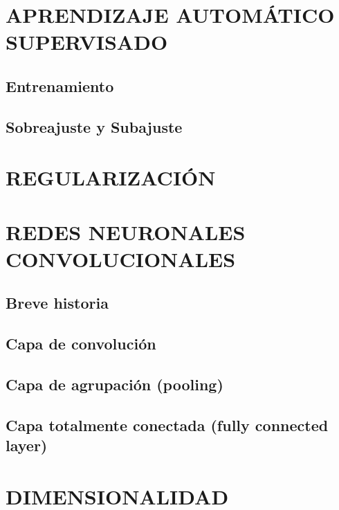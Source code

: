 \section{APRENDIZAJE AUTOMÁTICO SUPERVISADO}

\subsection{Entrenamiento}

\subsection{Sobreajuste y Subajuste}

\section{REGULARIZACIÓN}

\section{REDES NEURONALES CONVOLUCIONALES}

\subsection{Breve historia}

\subsection{Capa de convolución}

\subsection{Capa de agrupación (pooling)}

\subsection{Capa totalmente conectada (fully connected layer)}

\section{DIMENSIONALIDAD}


